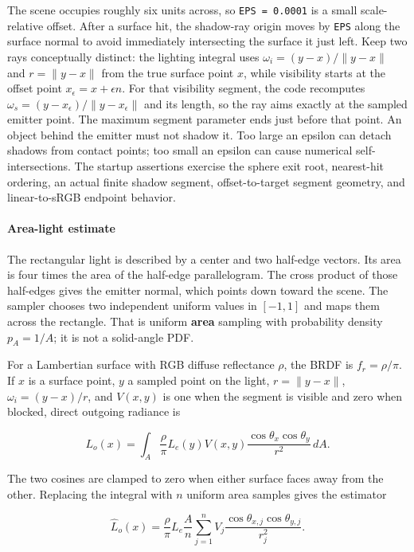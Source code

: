 The scene occupies roughly six units across, so \texttt{EPS\ =\ 0.0001} is a small scale-relative offset. After a surface hit, the shadow-ray origin moves by \texttt{EPS} along the surface normal to avoid immediately intersecting the surface it just left. Keep two rays conceptually distinct: the lighting integral uses \(\omega_i=(y-x)/\|y-x\|\) and \(r=\|y-x\|\) from the true surface point \(x\), while visibility starts at the offset point \(x_\epsilon=x+\epsilon n\). For that visibility segment, the code recomputes \(\omega_s=(y-x_\epsilon)/\|y-x_\epsilon\|\) and its length, so the ray aims exactly at the sampled emitter point. The maximum segment parameter ends just before that point. An object behind the emitter must not shadow it. Too large an epsilon can detach shadows from contact points; too small an epsilon can cause numerical self-intersections. The startup assertions exercise the sphere exit root, nearest-hit ordering, an actual finite shadow segment, offset-to-target segment geometry, and linear-to-sRGB endpoint behavior.

\paragraph{Area-light estimate}\label{area-light-estimate}

The rectangular light is described by a center and two half-edge vectors. Its area is four times the area of the half-edge parallelogram. The cross product of those half-edges gives the emitter normal, which points down toward the scene. The sampler chooses two independent uniform values in \([-1,1]\) and maps them across the rectangle. That is uniform \textbf{area} sampling with probability density \(p_A=1/A\); it is not a solid-angle PDF.

For a Lambertian surface with RGB diffuse reflectance \(\rho\), the BRDF is \(f_r=\rho/\pi\). If \(x\) is a surface point, \(y\) a sampled point on the light, \(r=\|y-x\|\), \(\omega_i=(y-x)/r\), and \(V(x,y)\) is one when the segment is visible and zero when blocked, direct outgoing radiance is

\[
L_o(x)=\int_A \frac{\rho}{\pi} L_e(y) V(x,y)
\frac{\cos\theta_x\cos\theta_y}{r^2}\,dA.
\]

The two cosines are clamped to zero when either surface faces away from the other. Replacing the integral with \(n\) uniform area samples gives the estimator

\[
\widehat L_o(x)=\frac{\rho}{\pi}L_e\frac{A}{n}
\sum_{j=1}^{n} V_j\frac{\cos\theta_{x,j}\cos\theta_{y,j}}{r_j^2}.
\]


